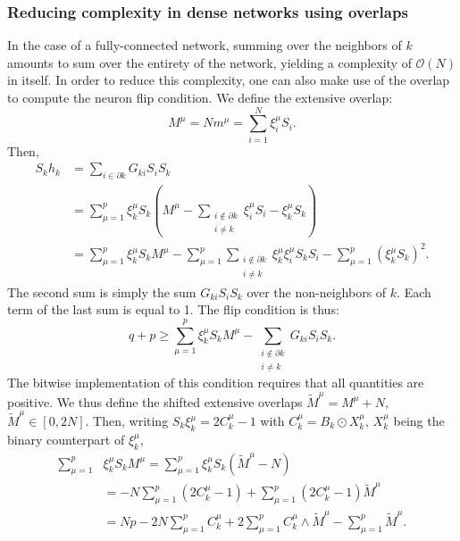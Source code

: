\subsubsection{Reducing complexity in dense networks using overlaps}
In the case of a fully-connected network, summing over the neighbors of $k$ amounts to sum over the entirety of the network, yielding a complexity of $\mathcal{O}(N)$ in itself. In order to reduce this complexity, one can also make use of the overlap to compute the neuron flip condition. We define the extensive overlap:
\begin{equation}
    M^\mu= N m^\mu = \sum_{i=1}^N \xi_i^\mu S_i.
    \label{eq:extensive_overlaps}
\end{equation}
Then,
\begin{align*}
    S_kh_k &=
    \sum_{i \in \partial k} G_{ki} S_i S_k \\
    &= \sum_{\mu=1}^p \xi_k^\mu  S_k \left(M^\mu - \sum_{\substack{i \notin \partial k \\ i \neq k}}\xi_i^\mu S_i - \xi_k^\mu S_k \right)\\
    &= \sum_{\mu=1}^p \xi_k^\mu S_k M^\mu -  \sum_{\mu=1}^p \sum_{\substack{i \notin \partial k \\ i \neq k}} \xi_k^\mu \xi_i^\mu S_k S_i - \sum_{\mu=1}^p \left(\xi_k^\mu S_k \right) ^2.
\end{align*}
The second sum is simply the sum $G_{ki} S_i S_k$ over the non-neighbors of $k$. Each term of the last sum is equal to 1. The flip condition is thus:
\begin{equation}
 q+p  \geq \sum_{\mu=1}^p \xi_k^\mu S_k M^\mu - \sum_{\substack{i \notin \partial k \\ i \neq k}} G_{ki} S_i S_k.
\end{equation}
The bitwise implementation of this condition requires that all quantities are positive. We thus define the shifted extensive overlaps
$ \tilde{M}^\mu = M^\mu + N$, $\tilde{M}^\mu \in[0, 2N]$. Then, writing $S_k \xi_k^\mu = 2 C_k^\mu -1$ with $C_k^\mu = B_k \odot X_k^\mu$, $X_k^\mu $ being the binary counterpart of $\xi_k^\mu$,
\begin{align*}
    \sum_{\mu=1}^p &\xi_k^\mu S_k M^\mu = \sum_{\mu=1}^p \xi_k^\mu S_k (\tilde{M}^\mu - N)\\
    &= - N \sum_{\mu=1}^p \left(2C_k^\mu - 1 \right) + \sum_{\mu=1}^p \left(2 C_k^\mu-1\right) \tilde{M}^\mu\\
    &= Np - 2N \sum_{\mu=1}^p C_k^\mu + 2 \sum_{\mu=1}^p C_k^\mu \wedge \tilde{M}^\mu- \sum_{\mu=1}^p \tilde{M}^\mu.
\end{align*}


